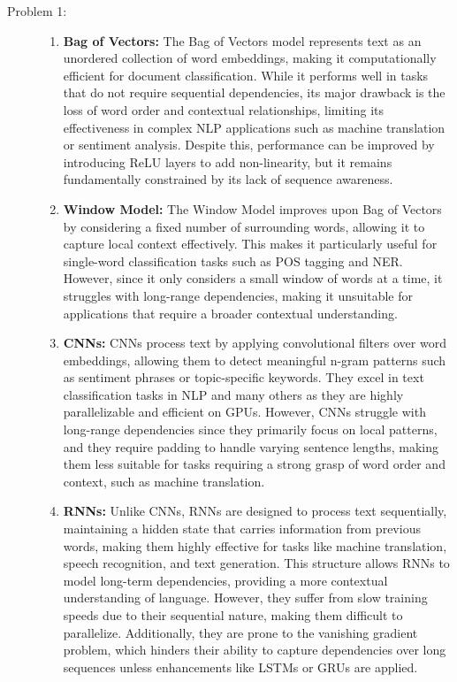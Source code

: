 \documentclass[10pt]{article}
\begin{document}
\begin{description}
\item[Problem 1:]  \hfill %

\begin{enumerate}
    \item \textbf{Bag of Vectors:} The Bag of Vectors model represents text as an unordered collection of word embeddings, 
    making it computationally efficient for document classification. While it performs well in tasks that do not require sequential dependencies, 
    its major drawback is the loss of word order and contextual relationships, limiting its effectiveness in complex NLP applications such as machine 
    translation or sentiment analysis. Despite this, performance can be improved by introducing ReLU layers to add non-linearity, 
    but it remains fundamentally constrained by its lack of sequence awareness.
    
    \item \textbf{Window Model:} The Window Model improves upon Bag of Vectors by considering a fixed number of surrounding words, 
    allowing it to capture local context effectively. This makes it particularly useful for single-word classification tasks such as 
    POS tagging and NER. However, since it only considers a small window of words at a time, it struggles with long-range dependencies, 
    making it unsuitable for applications that require a broader contextual understanding.
    
    \item \textbf{CNNs:} CNNs process text by applying convolutional filters over word embeddings, allowing them to detect meaningful 
    n-gram patterns such as sentiment phrases or topic-specific keywords. They excel in text classification tasks in NLP and many others
    as they are highly parallelizable and efficient on GPUs. However, CNNs struggle with long-range dependencies since they primarily 
    focus on local patterns, and they require padding to handle varying sentence lengths, 
    making them less suitable for tasks requiring a strong grasp of word order and context, such as machine translation.
    
    \item \textbf{RNNs:} Unlike CNNs, RNNs are designed to process text sequentially, maintaining a hidden state that carries information from previous words, 
    making them highly effective for tasks like machine translation, speech recognition, and text generation. This structure allows RNNs to model long-term 
    dependencies, providing a more contextual understanding of language. However, they suffer from slow training speeds due to their sequential nature, making 
    them difficult to parallelize. Additionally, they are prone to the vanishing gradient problem, which hinders their ability to capture dependencies over long 
    sequences unless enhancements like LSTMs or GRUs are applied.
\end{enumerate}


\end{description}
\end{document}
